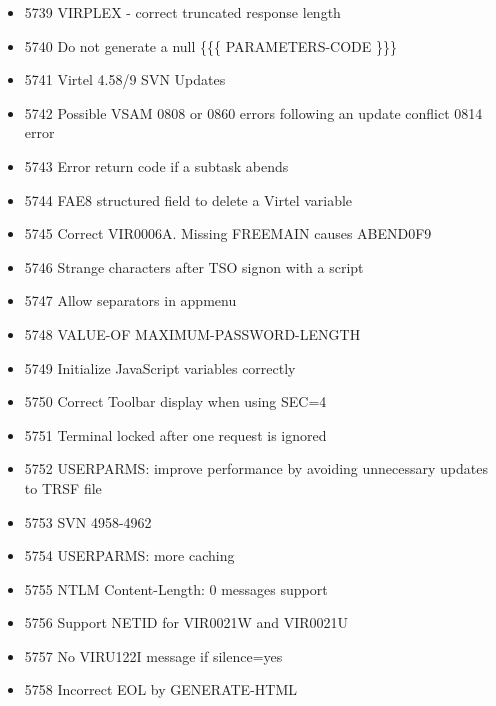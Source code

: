 \documentclass[letterpaper,10pt,english]{sphinxmanual}
\begin{document}
\begin{itemize}
\item {} 
5739 VIRPLEX - correct truncated response length

\item {} 
5740 Do not generate a null \{\{\{ PARAMETERS-CODE \}\}\}

\item {} 
5741 Virtel 4.58/9 SVN Updates

\item {} 
5742 Possible VSAM 0808 or 0860 errors following an update conflict 0814 error

\item {} 
5743 Error return code if a subtask abends

\item {} 
5744 FAE8 structured field to delete a Virtel variable

\item {} 
5745 Correct VIR0006A. Missing FREEMAIN causes ABEND0F9

\item {} 
5746 Strange characters after TSO signon with a script

\item {} 
5747 Allow separators in appmenu

\item {} 
5748 VALUE-OF MAXIMUM-PASSWORD-LENGTH

\item {} 
5749 Initialize JavaScript variables correctly

\item {} 
5750 Correct Toolbar display when using SEC=4

\item {} 
5751 Terminal locked after one request is ignored

\item {} 
5752 USERPARMS: improve performance by avoiding unnecessary updates to TRSF file

\item {} 
5753 SVN 4958-4962

\item {} 
5754 USERPARMS: more caching

\item {} 
5755 NTLM Content-Length: 0 messages support

\item {} 
5756 Support NETID for VIR0021W and VIR0021U

\item {} 
5757 No VIRU122I message if silence=yes

\item {} 
5758 Incorrect EOL by GENERATE-HTML

\end{itemize}



\renewcommand{\indexname}{Index}
\printindex
\end{document}
